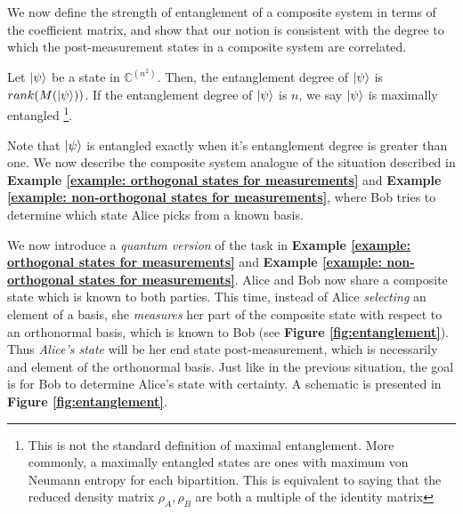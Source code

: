 We now define the strength of entanglement of a composite system in terms of the coefficient matrix, and show that our notion is consistent with the degree to which the post-measurement states in a composite system are correlated.

\begin{definition} \label{def: maximally entangled}
 Let $\ket{\psi}$ be a state in ${\mathbb{C}}^{(n^2)}$.  Then, the entanglement degree of $\ket{\psi}$ is $rank(M(\ket{\psi}))$.  If the entanglement degree of $\ket{\psi}$ is $n$, we say $\ket{\psi}$ is maximally entangled \footnote{This is not the standard definition of maximal entanglement.  More commonly, a maximally entangled states are ones with maximum von Neumann entropy for each bipartition. This is equivalent to saying that the reduced density matrix $\rho_A, \rho_B$ are both a multiple of the identity matrix}.
\end{definition}


Note that $\ket{\psi}$ is entangled exactly when it's entanglement degree is greater than one.  We now describe the composite system analogue of the situation described in \textbf{Example \ref{example: orthogonal states for measurements}} and \textbf{Example \ref{example: non-orthogonal states for measurements}}, where Bob tries to determine which state Alice picks from a known basis. 

We now introduce a {\emph{quantum version}} of the task in \textbf{Example \ref{example: orthogonal states for measurements}} and \textbf{Example \ref{example: non-orthogonal states for measurements}}. Alice and Bob now share a composite state which is known to both parties.  This time, instead of Alice {\emph{selecting}} an element of a basis, she {\emph{measures}} her part of the composite state with respect to an orthonormal basis, which is known to Bob (see \textbf{Figure \ref{fig:entanglement}}).  Thus {\emph{Alice's state}} will be her end state post-measurement, which is necessarily and element of the orthonormal basis.  Just like in the previous situation, the goal is for Bob to determine Alice's state with certainty.  A schematic is presented in \textbf{Figure \ref{fig:entanglement}}.


